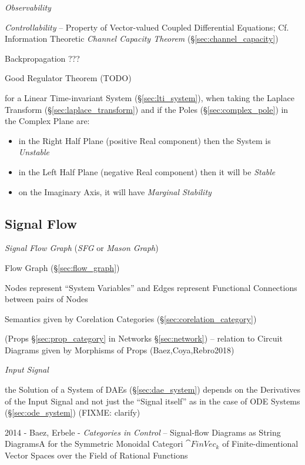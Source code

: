 \emph{Observability}

\emph{Controllability} -- Property of Vector-valued Coupled
Differential Equations; \fist Cf. Information Theoretic \emph{Channel
  Capacity Theorem} (\S\ref{sec:channel_capacity})

Backpropagation ???

Good Regulator Theorem (TODO)

for a Linear Time-invariant System (\S\ref{sec:lti_system}), when taking the
Laplace Transform (\S\ref{sec:laplace_transform}) and if the Poles
(\S\ref{sec:complex_pole}) in the Complex Plane are:
\begin{itemize}
  \item in the Right Half Plane (positive Real component) then the System is
    \emph{Unstable}
  \item in the Left Half Plane (negative Real component) then it will be
    \emph{Stable}
  \item on the Imaginary Axis, it will have \emph{Marginal Stability}
\end{itemize}



\subsection{Signal Flow}\label{sec:signal_flow}

\emph{Signal Flow Graph} (\emph{SFG} or \emph{Mason Graph})

\fist Flow Graph (\S\ref{sec:flow_graph})

Nodes represent ``System Variables'' and Edges represent Functional
Connections between pairs of Nodes

Semantics given by Corelation Categories
(\S\ref{sec:corelation_category})

(Props \S\ref{sec:prop_category} in Networks \S\ref{sec:network}) -- relation to
Circuit Diagrams given by Morphisms of Props (Baez,Coya,Rebro2018)

\emph{Input Signal}

\fist the Solution of a System of DAEs (\S\ref{sec:dae_system}) depends on
the Derivatives of the Input Signal and not just the ``Signal itself'' as in
the case of ODE Systems (\S\ref{sec:ode_system})
(FIXME: clarify)

2014 - Baez, Erbele - \emph{Categories in Control} -- Signal-flow Diagrams as
String DiagramsA for the Symmetric Monoidal Categori $\cat{FinVec}_k$ of
Finite-dimentional Vector Spaces over the Field of Rational Functions



